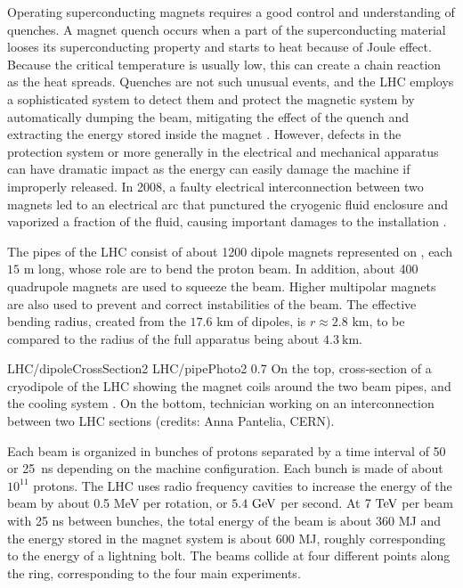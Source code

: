     Operating superconducting magnets requires a good control and understanding of quenches.
    A magnet quench occurs when a part of the superconducting material looses its superconducting
    property and starts to heat because of Joule effect. Because the critical temperature
    is usually low, this can create a chain reaction as the heat spreads. Quenches are
    not such unusual events, and the LHC employs a sophisticated system to detect them and protect
    the magnetic system by automatically dumping the beam, mitigating the effect of the
    quench and extracting the energy stored inside the magnet \cite{LHCmagnets}.
    However, defects in the protection
    system or more generally in the electrical and mechanical apparatus can have dramatic
    impact as the energy can easily damage the machine if improperly released. In 2008,
    a faulty electrical interconnection between two magnets led to an electrical arc that
    punctured the cryogenic fluid enclosure and vaporized a fraction of the fluid, causing
    important damages to the installation \cite{LHCindicent}.

    The pipes of the LHC consist of about 1200 dipole magnets represented on
    , each $15$ m long, whose role are to bend the proton beam.
    In addition, about 400 quadrupole magnets are used to squeeze the
    beam. Higher multipolar magnets are also used to prevent and correct instabilities of
    the beam. The effective bending radius, created from the $17.6$ km of dipoles, is
    $r \approx 2.8$ km, to be compared to the radius of the full apparatus being about $4.3~\text{km}$.

                     {LHC/dipoleCrossSection2}
                     {LHC/pipePhoto2}
                     {0.7}
                     {On the top, cross-section of a cryodipole of the LHC
                     showing the magnet coils around the two beam pipes, and the cooling system \cite{LHC}.
                     On the bottom, technician working on an interconnection between two LHC
                     sections (credits: Anna Pantelia, CERN).}

    Each beam is organized in bunches of protons separated by a time interval of 50 or
    25~ns depending on the machine configuration. Each bunch is made of about $10^{11}$
    protons. The LHC uses radio frequency cavities to increase the energy of the beam by
    about 0.5 MeV per rotation, or $5.4~\text{GeV}$ per second. At $7~\text{TeV}$ per beam with 25 ns
    between bunches, the total energy of the beam is about 360 MJ and the energy stored
    in the magnet system is about 600 MJ, roughly corresponding to the energy of a
    lightning bolt. The beams collide at four different points along the
    ring, corresponding to the four main experiments.

